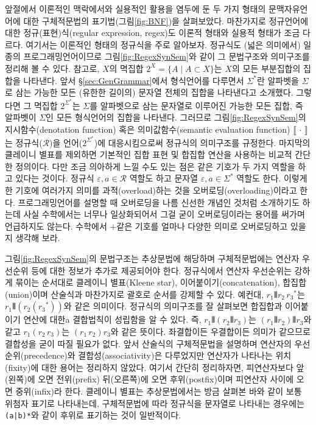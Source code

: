 앞절에서 이론적인 맥락에서와 실용적인 활용을 염두에 둔 두 가지 형태의
문맥자유언어에 대한 구체적문법의 표기법(그림\;\ref{fig:BNF})을 살펴보았다.
마찬가지로 정규언어에 대한 정규(표현)식(regular expression, regex)도
이론적 형태와 실용적 형태가 조금 다르다. 여기서는 이론적인 형태의
정규식을 주로 알아보자. 정규식도 (넓은 의미에서) 일종의 프로그래밍언어이므로
그림\;\ref{fig:RegexSynSem}와 같이 그 문법구조와 의미구조를 정리해 볼 수 있다.
참고로, $X$의 멱집합 $2^X = \{A\mid A\subset X\}$는 $X$의 모든 부분집합의
집합을 나타낸다. 앞서 \S\ref{sec:GenGrammar}에서 형식언어를 다루면서
$\Sigma^{*}$란 알파벳을 $\Sigma$로 삼는 가능한 모든 (유한한 길이의)
문자열 전체의 집합을 나타낸다고 소개했다. 그렇다면 그 멱집합
$2^{\Sigma^{*}}$는 $\Sigma$를 알파벳으로 삼는 문자열로 이루어진
가능한 모든 집합, 즉 알파벳이 $\Sigma$인 모든 형식언어의 집합을 나타낸다.
그러므로 그림\;\ref{fig:RegexSynSem}의 지시함수(denotation function) 혹은
의미값함수(semantic evaluation function) $\llbracket\,\cdot\,\rrbracket$는
정규식($\mathcal{R}$)을 언어($2^{\Sigma^{*}}$)에 대응시킴으로써 정규식의
의미구조를 규정한다. 마지막의 클레이니 별표를 제외하면 기본적인 집합 표현
및 합집합 연산을 사용하는 비교적 간단한 정의이다. 다만 조금 의아하게 느낄
수도 있는 점은 같은 기호가 두 가지 역할을 하고 있다는 것이다.
정규식 $\varepsilon,a\in\mathcal{R}$ 역할도 하고
문자열 $\varepsilon,a\in\Sigma^{*}$ 역할도 한다.
이렇게 한 기호에 여러가지 의미를 과적(overload)하는 것을
오버로딩(overloading)이라고 한다. 프로그래밍언어를 설명할
때 오버로딩을 나름 신선한 개념인 것처럼 소개하기도 하는데
사실 수학에서는 너무나 일상화되어서 그걸 굳이 오버로딩이라는
용어를 써가며 언급하지도 않는다. 수학에서 $+$같은 기호를 얼마나
다양한 의미로 오버로딩하고 있을지 생각해 보라.

그림\;\ref{fig:RegexSynSem}의 문법구조는 추상문법에 해당하며
구체적문법에는 연산자 우선순위 등에 대한 정보가 추가로 제공되어야 한다.
정규식에서 연산자 우선순위는 강하게 묶이는 순서대로
클레이니 별표(Kleene star), 이어붙이기(concatenation), 합집합(union)이며
산술식과 마찬가지로 괄호로 순서를 강제할 수 있다. 예컨대,
$r_1\VERT r_2\,{r_3}^{*}$는 $r_1\VERT(r_2({r_3}^{*}))$와 같은 의미이다.
정규식의 의미구조를 잘 살펴보면 합집합과 이어붙이기 연산에 대한a
결합법칙이 성립함을 알 수 있다.
즉, $r_1\VERT(r_2\VERT r_3)$는 $(r_1\VERT r_2)\VERT r_3$와
같고 $r_1(r_2\,r_3)$는 $(r_1\,r_2)r_3$와 같은 뜻이다.
좌결합이든 우결합이든 의미가 같으므로 결합성을 굳이 따질 필요가 없다.
앞서 산술식의 구체적문법을 설명하며 연산자의 우선순위(precedence)와
결합성(associativity)은 다루었지만 연산자가 나타나는 위치(fixity)에
대한 용어는 정리하지 않았다. 여기서 간단히 정리하자면, 피연산자보다
앞(왼쪽)에 오면 전위(prefix) 뒤(오른쪽)에 오면 후위(postfix)이며
피연산자 사이에 오면 중위(infix)라 한다. 클레이니 별표는 추상문법에서는
방금 살펴본 바와 같이 보통 위첨자 표기로 나타내는데, 구체적문법에 따라
정규식을 문자열로 나타내는 경우에는 \verb/(a|b)*/와 같이 후위로
표기하는 것이 일반적이다.

